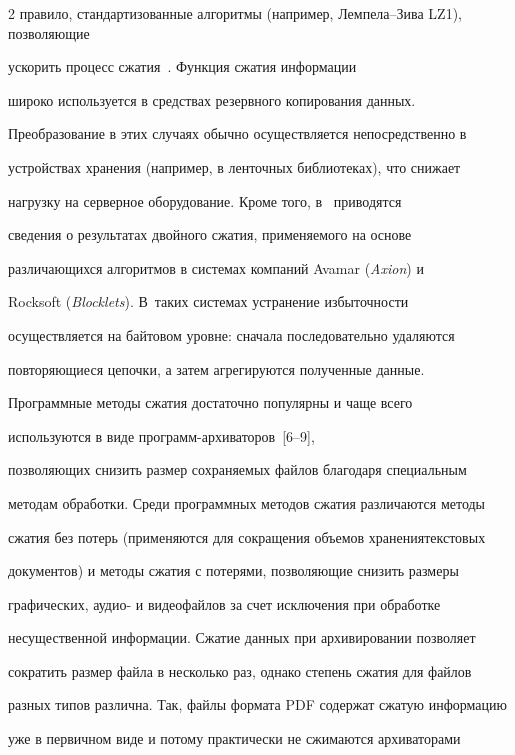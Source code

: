 \begin{multicols}{2}
правило, стандартизованные алгоритмы (например, Лемпела--Зива LZ1), позволяющие 


ускорить процесс сжатия~\cite{7che, 9che}. Функция сжатия информации 


широко используется в средствах резервного копирования данных. 


Преобразование в этих случаях обычно осуществляется непосредственно в 


устройствах хранения (например, в ленточных биб\-лио\-те\-ках), что снижает 


нагрузку на серверное обору\-до\-ва\-ние. Кроме того, в~\cite{13che} приводятся 


сведения о результатах двойного сжатия, применяемого на основе 


различающихся алгоритмов в системах компаний Avamar (\textit{Axion}) и 


Rocksoft (\textit{Blocklets}). В~таких системах устранение избыточности 


осуществляется на байтовом уровне: сначала последовательно удаляются 


повторяющиеся цепочки, а затем агрегируются полученные данные.


     


     Программные методы сжатия достаточно популярны и чаще всего 


используются в виде программ-ар\-хи\-ва\-то\-ров~[6--9], 


позволяющих снизить размер сохраняемых файлов благодаря специальным 


методам обработки. Среди программных методов сжатия различаются методы 


сжатия без потерь (применяются для сокращения объемов хранения\linebreak текстовых 


документов) и методы сжатия с потерями, позволяющие снизить размеры 


графических, аудио- и видеофайлов за счет исключения при обработке 


несущественной информации. Сжатие данных при архивировании позволяет 


сократить размер файла в несколько раз, однако степень сжатия для файлов 


разных типов различна. Так, файлы формата PDF содержат сжатую информацию 


уже в первичном виде и потому практически не сжимаются архиваторами 



\end{multicols}
